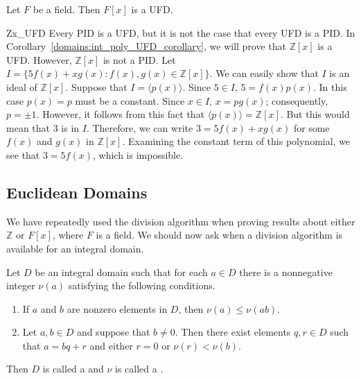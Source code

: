 \begin{corollary}
Let $F$ be a field.  Then $F[x]$ is a UFD.
\end{corollary}

\begin{example}{Zx_UFD}
Every PID is a UFD, but it is not the case that every UFD is a PID. In Corollary~\ref{domains:int_poly_UFD_corollary}, we will prove that ${\mathbb Z}[x]$ is a UFD.  However,
${\mathbb Z}[x]$ is not a PID.  Let $I = \{ 5 f(x) + x g(x) : f(x), g(x)  \in {\mathbb Z}[x] \}$.  We can easily show that $I$ is an ideal of 
${\mathbb Z}[x]$.  Suppose that $I = \langle p(x) \rangle$.  Since $5 \in I$,  $5 = f(x) p(x)$.  In this case $p(x) = p$ must be a constant.  Since $x  \in I$, $x = p g(x)$; consequently, $p = \pm 1$. However, it follows from this fact that $\langle p(x) \rangle = {\mathbb Z}[x]$. But this would 
mean that 3 is in $I$. Therefore, we can write $3 = 5 f(x) + x g(x)$ for  some $f(x)$ and $g(x)$ in ${\mathbb Z}[x]$.  Examining the constant term of  this polynomial, we see that $3 = 5 f(x)$, which is impossible. 
\end{example}


\subsection*{Euclidean Domains}

We have repeatedly used the division algorithm when proving results about either ${\mathbb Z}$ or $F[x]$, where $F$ is a field.  We
should now ask when a division algorithm is available for an integral domain. 

Let $D$ be an integral domain such that for each $a \in D$ there is  a nonnegative integer $\nu(a)$\label{notevaluation} satisfying the
following conditions. 
\begin{enumerate}
 
\item
If $a$ and $b$ are nonzero elements in $D$, then $\nu(a) \leq \nu(ab)$.  
 
\item
Let $a, b \in D$ and suppose that $b \neq 0$. Then there exist elements $q, r \in D$ such that $a = bq +r$ and either $r=0$ or
$\nu(r) < \nu(b)$. 
 
\end{enumerate}
Then $D$ is called a  and $\nu$ is called a .  


